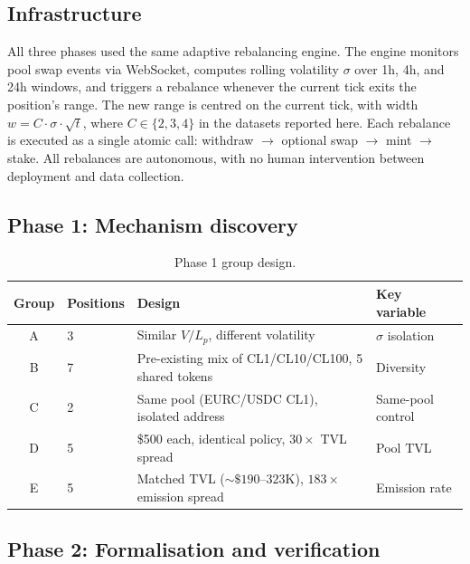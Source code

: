 \documentclass[11pt,a4paper]{article}
\theoremstyle{plain}
\begin{document}
\subsection{Infrastructure}\label{sec:infrastructure}

All three phases used the same adaptive rebalancing engine. The engine monitors pool swap events via WebSocket, computes rolling volatility $\sigma$ over 1h, 4h, and 24h windows, and triggers a rebalance whenever the current tick exits the position's range. The new range is centred on the current tick, with width $w = C \cdot \sigma \cdot \sqrt{t}$, where $C \in \{2, 3, 4\}$ in the datasets reported here. Each rebalance is executed as a single atomic call: withdraw $\to$ optional swap $\to$ mint $\to$ stake. All rebalances are autonomous, with no human intervention between deployment and data collection.

\subsection{Phase 1: Mechanism discovery}\label{sec:phase1}

\begin{table}[H]
\centering
\caption{Phase 1 group design.}
\label{tab:phase1-groups}
\begin{tabular}{@{}clL{8.5cm}l@{}}
\toprule
Group & Positions & Design & Key variable \\
\midrule
A & 3 & Similar $V/L_p$, different volatility & $\sigma$ isolation \\
B & 7 & Pre-existing mix of CL1/CL10/CL100, 5 shared tokens & Diversity \\
C & 2 & Same pool (EURC/USDC CL1), isolated address & Same-pool control \\
D & 5 & \$500 each, identical policy, $30\times$ TVL spread & Pool TVL \\
E & 5 & Matched TVL (${\sim}\$190$--$323$K), $183\times$ emission spread & Emission rate \\
\bottomrule
\end{tabular}
\end{table}

\subsection{Phase 2: Formalisation and verification}\label{sec:phase2}
\end{document}
